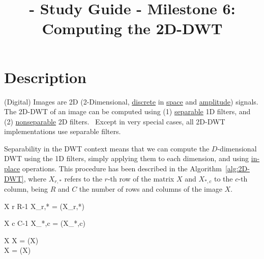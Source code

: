 
\title{\SM{} - Study Guide - Milestone 6: Computing the 2D-DWT}

\maketitle

\section{Description}

(Digital) Images are 2D (2-Dimensional,
\href{https://en.wikipedia.org/wiki/Discrete_time_and_continuous_time}{discrete}
in \href{https://en.wikipedia.org/wiki/Space}{space} and
\href{https://en.wikipedia.org/wiki/Amplitude}{amplitude})
signals. The 2D-DWT of an image can be computed using (1)
\href{https://en.wikipedia.org/wiki/Separable_filter}{separable} 1D
filters, and (2)
\href{https://en.wikipedia.org/wiki/Non-separable_wavelet}{nonseparable}
2D filters.~\cite{sayood2017introduction} Except in very special
cases, all 2D-DWT implementations use separable filters.

Separability in the DWT context means that we can compute the
$D$-dimensional DWT using the 1D filters, simply applying them to each
dimension, and
using \href{https://en.wikipedia.org/wiki/In-place_algorithm}{in-place}
operations. This procedure has been described in the
Algorithm~\ref{alg:2D-DWT}, where $X_{r,*}$ refers to the $r$-th row
of the matrix $X$ and $X_{*,c}$ to the $c$-th column, being $R$ and
$C$ the number of rows and columns of the image $X$.

\begin{pseudocode}{}{X}
  \label{alg:Rows-DWT}
  \FOR r  \TO R-1 \DO
  X_{r,*} = (X_{r,*})\\
\end{pseudocode}

\begin{pseudocode}{}{X}
  \label{alg:Columns-DWT}
  \FOR c  \TO C-1 \DO
  X_{*,c} = (X_{*,c})\\
\end{pseudocode}

\begin{pseudocode}{}{X}
  \label{alg:2D-DWT}
  X = (X)\\
  X = (X)\\
\end{pseudocode}

